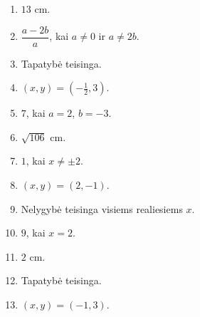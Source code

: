 \documentclass[11pt,a4paper]{article}
\begin{document}
\begin{enumerate}
\item \(13\text{ cm}\).
\item \(\dfrac{a-2b}{a}\), kai \(a\ne0\) ir \(a\ne2b\).
\item Tapatybė teisinga.
\item \((x,y)=(-\frac12,3)\).
\item \(7\), kai \(a=2\), \(b=-3\).
\item \(\sqrt{106}\text{ cm}\).
\item \(1\), kai \(x\ne\pm2\).
\item \((x,y)=(2,-1)\).
\item Nelygybė teisinga visiems realiesiems \(x\).
\item \(9\), kai \(x=2\).
\item \(2\text{ cm}\).
\item Tapatybė teisinga.
\item \((x,y)=(-1,3)\).
\end{enumerate}
\end{document}
